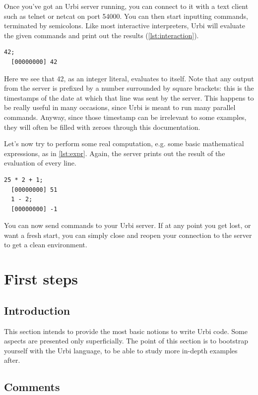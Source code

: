 \documentclass[openright,twoside,12pt]{report}
\newcommand{\urbi}{Urbi\xspace}
\newcommand{\lst}[1]{\autoref{lst:#1}}
\begin{document}
Once you've got an \urbi server running, you can connect to it with a
text client such as telnet or netcat on port 54000. You can then start
inputting commands, terminated by semicolons. Like most interactive
interpreters, \urbi will evaluate the given commands and print out the
results (\lst{interaction}).

\begin{lstlisting}[caption=Evaluating literal values,label=lst:interaction]
  42;
  [00000000] 42
\end{lstlisting}

Here we see that 42, as an integer literal, evaluates to itself. Note
that any output from the server is prefixed by a number surrounded by
square brackets: this is the timestamps of the date at which that line
was sent by the server. This happens to be really useful in many
occasions, since \urbi is meant to run many parallel commands. Anyway,
since those timestamp can be irrelevant to some examples, they will
often be filled with zeroes through this documentation.

Let's now try to perform some real computation, e.g. some basic
mathematical expressions, as in \lst{expr}. Again, the server prints
out the result of the evaluation of every line.

\begin{lstlisting}[caption=Evaluating composite expressions,label=lst:expr]
  25 * 2 + 1;
  [00000000] 51
  1 - 2;
  [00000000] -1
\end{lstlisting}

You can now send commands to your \urbi server. If at any point you
get lost, or want a fresh start, you can simply close and reopen your
connection to the server to get a clean environment.

\chapter{First steps}

\section{Introduction}

This section intends to provide the most basic notions to write \urbi
code. Some aspects are presented only superficially. The point of this
section is to bootstrap yourself with the \urbi language, to be able
to study more in-depth examples after.

\section{Comments}
\end{document}
